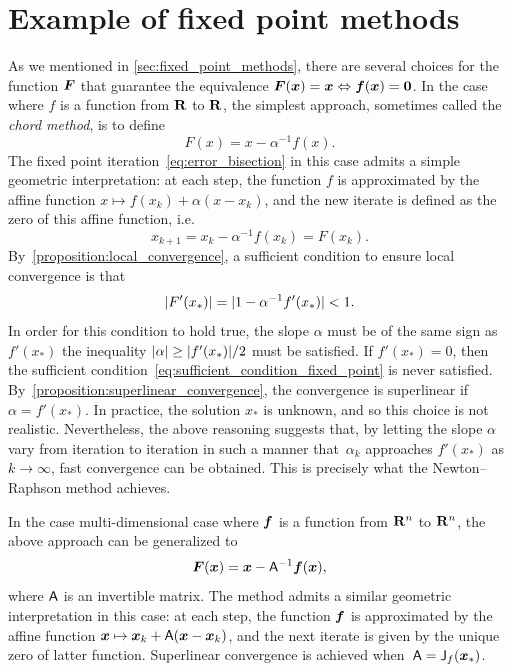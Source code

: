 \section{Example of fixed point methods}
As we mentioned in \cref{sec:fixed_point_methods},
there are several choices for the function $\mathbf{\boldsymbol{F}}$ that guarantee
the equivalence $\mathbf{\boldsymbol{F}}(\mathbf{\boldsymbol{x}}) = \mathbf{\boldsymbol{x}} \Leftrightarrow \mathbf{\boldsymbol{f}}(\mathbf{\boldsymbol{x}}) = \mathbf{\boldsymbol{0}}$.
In the case where $f$ is a function from $\mathbf R$ to $\mathbf R$,
the simplest approach, sometimes called the \emph{chord method}, is to define
\[
    F(x) = x - \alpha^{-1} f(x).
\]
The fixed point iteration~\eqref{eq:error_bisection} in this case admits a simple geometric interpretation:
at each step, the function $f$ is approximated by the affine function $x \mapsto f(x_k) + \alpha (x - x_k)$,
and the new iterate is defined as the zero of this affine function,
i.e.
\begin{equation}
    \label{eq:naive_fixed_point}
    x_{k+1} = x_k - \alpha^{-1} f(x_k) = F(x_k).
\end{equation}
By~\cref{proposition:local_convergence},
a sufficient condition to ensure local convergence is that
\begin{equation}
    \label{eq:sufficient_condition_fixed_point}
    \lvert F'(x_*)\rvert = \lvert1 - \alpha^{-1} f'(x_*)\rvert < 1.
\end{equation}
In order for this condition to hold true,
the slope $\alpha$ must be of the same sign as $f'(x_*)$
the inequality $\lvert\alpha\rvert \geq \lvert f'(x_*)\rvert/2$ must be satisfied.
If $f'(x_*) = 0$,
then the sufficient condition~\eqref{eq:sufficient_condition_fixed_point} is never satisfied.
By~\cref{proposition:superlinear_convergence},
the convergence is superlinear if~$\alpha = f'(x_*)$.
In practice, the solution $x_*$ is unknown,
and so this choice is not realistic.
Nevertheless, the above reasoning suggests that, by letting the slope $\alpha$ vary from iteration to iteration in such a manner that~$\alpha_k$ approaches $f'(x_*)$ as $k \to \infty$,
fast convergence can be obtained.
This is precisely what the Newton--Raphson method achieves.

In the case multi-dimensional case where $\mathbf{\boldsymbol{f}}$ is a function from $\mathbf R^n$ to $\mathbf R^n$,
the above approach can be generalized to
\[
    \mathbf{\boldsymbol{F}}(\mathbf{\boldsymbol{x}}) = \mathbf{\boldsymbol{x}} - \mathsf A^{-1} \mathbf{\boldsymbol{f}}(\mathbf{\boldsymbol{x}}),
\]
where $\mathsf A$ is an invertible matrix.
The method admits a similar geometric interpretation in this case:
at each step, the function $\mathbf{\boldsymbol{f}}$ is approximated by the affine function
$\mathbf{\boldsymbol{x}} \mapsto \mathbf{\boldsymbol{x}}_k + \mathsf A(\mathbf{\boldsymbol{x}} - \mathbf{\boldsymbol{x}}_k)$,
and the next iterate is given by the unique zero of latter function.
Superlinear convergence is achieved when~$\mathsf A = \mathsf J_f(\mathbf{\boldsymbol{x}}_*)$.

